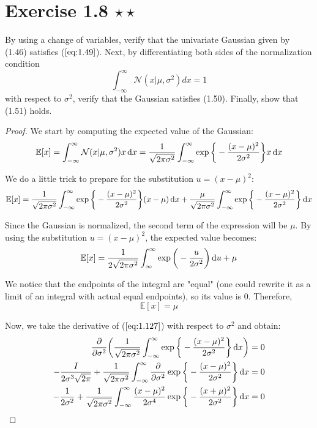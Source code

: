 \section*{Exercise 1.8 $\star \star$}
By using a change of variables, verify that the univariate Gaussian
given by (1.46) satisfies ($\ref{eq:1.49}$). Next, by differentiating both sides
of the normalization condition
\begin{equation*}\label{eq:1.127}\tag{1.127}
    \int_{-\infty}^{\infty} \mathcal{N} (x | \mu, \sigma^2) dx = 1
\end{equation*}
with respect to $\sigma^2$, verify that the Gaussian satisfies (1.50). Finally,
show that (1.51) holds.

\vspace{1em}
\begin{proof}
    We start by computing the expected value of the Gaussian:
    \[
        \mathbb{E}[x] = \int_{-\infty}^{\infty} \mathcal{N}(x | \mu, \sigma^2) x \mathop{}\!\mathrm{d} x
        = \frac{1}{\sqrt{2\pi\sigma^2}} \int_{-\infty}^{\infty} 
            \exp \bigg\{-\frac{(x - \mu)^2}{2\sigma^2}\bigg\} x \mathop{}\!\mathrm{d} x
    \] 

    We do a little trick to prepare for the substitution $u = (x - \mu)^2$:
    \[
        \mathbb{E}[x] = \frac{1}{\sqrt{2\pi\sigma^2}} \int_{-\infty}^{\infty} 
        \exp\bigg\{-\frac{(x - \mu)^2}{2\sigma^2}\bigg\} (x - \mu) \mathop{}\!\mathrm{d} x 
        + \frac{\mu}{\sqrt{2\pi\sigma^2}} \int_{-\infty}^{\infty} \exp\bigg\{-\frac{(x - \mu)^2}{2\sigma^2}\bigg\} \mathop{}\!\mathrm{d} x
    \] 

    Since the Gaussian is normalized, the second term of the expression will be $\mu$.
    By using the substitution $u = (x - \mu)^2$, the expected value becomes:
    \[
        \mathbb{E}[x] 
        = \frac{1}{2\sqrt{2\pi\sigma^2}} \int_{\infty}^{\infty} \exp\bigg(-\frac{u}{2\sigma^2}\bigg) \mathop{}\!\mathrm{d} u + \mu
    \] 

    We notice that the endpoints of the integral are "equal" (one could rewrite it as a
    limit of an integral with actual equal endpoints), so its value is 0. Therefore,
    \begin{equation}\label{eq:1.49}\tag{1.49}
        \mathbb{E}[x] = \mu
    \end{equation}

    Now, we take the derivative of ($\ref{eq:1.127}$) with respect to $\sigma^2$ and obtain:
    \begin{align*}
        \pdv{\sigma^2} \bigg(\frac{1}{\sqrt{2\pi \sigma^2}} 
        \int_{-\infty}^{\infty} \exp \bigg\{-\frac{(x - \mu)^2}{2\sigma^2}\bigg\} \mathop{}\!\mathrm{d} x\bigg) &= 0 \\
        -\frac{I}{2\sigma^3\sqrt{2\pi}} + 
        \frac{1}{\sqrt{2\pi\sigma^2}} \int_{-\infty}^{\infty} \pdv{\sigma^2} 
        \exp \bigg\{-\frac{(x - \mu)^2}{2\sigma^2}\bigg\} \mathop{}\!\mathrm{d} x &= 0 \\
        -\frac{1}{2\sigma^2} + 
        \frac{1}{\sqrt{2\pi\sigma^2}} \int_{-\infty}^{\infty}
        \frac{(x - \mu)^2}{2\sigma^4} \exp\bigg\{-\frac{(x + \mu)^2}{2\sigma^2}\bigg\} \mathop{}\!\mathrm{d} x &= 0
    \end{align*}


\end{proof}
